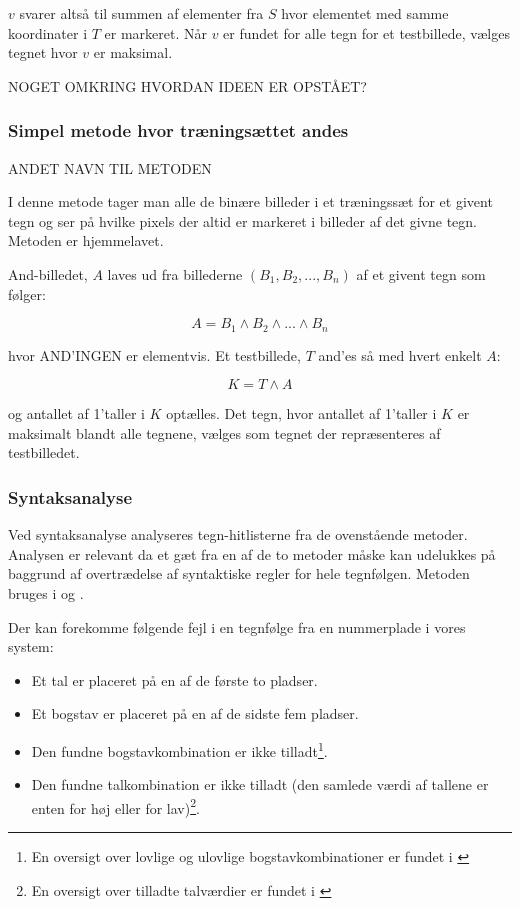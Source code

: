 $v$ svarer altså til summen af elementer fra $S$ hvor elementet med samme koordinater i $T$ er markeret. Når $v$ er fundet for alle tegn for et testbillede, vælges tegnet hvor $v$ er maksimal.

NOGET OMKRING HVORDAN IDEEN ER OPSTÅET?

\subsubsection{Simpel metode hvor træningsættet andes}

ANDET NAVN TIL METODEN

I denne metode tager man alle de binære billeder i et træningssæt for et givent tegn og ser på hvilke pixels der altid er markeret i billeder af det givne tegn. Metoden er hjemmelavet.

And-billedet, $A$ laves ud fra billederne $(B_{1},B_{2},...,B_{n})$ af et givent tegn som følger:

\begin{displaymath}
A = B_1 \wedge B_2 \wedge ... \wedge B_n
\end{displaymath}

hvor AND'INGEN er elementvis. Et testbillede, $T$ and'es så med hvert enkelt $A$:

\begin{displaymath}
K = T \wedge A
\end{displaymath}

og antallet af 1'taller i $K$ optælles. Det tegn, hvor antallet af 1'taller i $K$ er maksimalt blandt alle tegnene, vælges som tegnet der repræsenteres af testbilledet.

\subsubsection{Syntaksanalyse}

Ved syntaksanalyse analyseres tegn-hitlisterne fra de ovenstående metoder. Analysen er relevant da et gæt fra en af de to metoder måske kan udelukkes på baggrund af overtrædelse af syntaktiske regler for hele tegnfølgen. Metoden bruges i \cite{nijhuis} og \cite{kwas}.

Der kan forekomme følgende fejl i en tegnfølge fra en nummerplade i vores system:

\begin{itemize}
\item Et tal er placeret på en af de første to pladser.
\item Et bogstav er placeret på en af de sidste fem pladser.
\item Den fundne bogstavkombination er ikke tilladt\footnote{En oversigt over lovlige og ulovlige bogstavkombinationer er fundet i \cite{bogstav_komb}}.
\item Den fundne talkombination er ikke tilladt (den samlede værdi af tallene er enten for høj eller for lav)\footnote{En oversigt over tilladte talværdier er fundet i \cite{nrpl}}.
\end{itemize}

